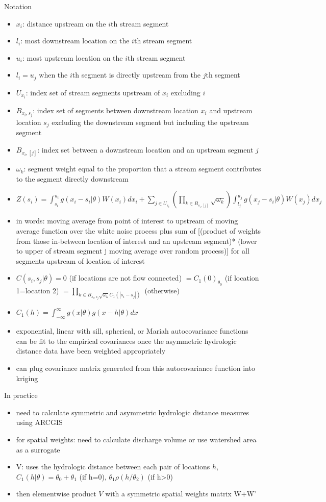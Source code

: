 \documentclass[12pt]{amsart}
\begin{document}
Notation
\begin{itemize}
\item $x_i$: distance upstream on the $i$th stream segment
\item $l_i$: most downstream location on the $i$th stream segment
\item $u_i$: most upstream location on the $i$th stream segment
\item $l_i=u_j$ when the $i$th segment is directly upstream from the $j$th segment
\item $U_{x_i}$: index set of stream segments upstream of $x_i$ excluding $i$
\item $B_{x_i, s_j}$: index set of segments between downstream location $x_i$ and upstream location $s_j$ excluding the downstream segment but including the upstream segment
\item $B_{x_i,[j]}$: index set between a downstream location and an upstream segment $j$
\item $\omega_k$: segment weight equal to the proportion that a stream segment contributes to the segment directly downstream
\item $Z(s_i)=\int_{s_i}^{u_i}g(x_i-s_i|\theta)W(x_i)dx_i + \sum_{j \in U_{s_i}} \left( \prod_{k \in B_{s_i,[j]}}\sqrt{\omega_k}\right) \int_{l_j}^{u_j} g(x_j-s_i|\theta)W(x_j)dx_j$
\item in words: moving average from point of interest to upstream of moving average function over the white noise process plus sum of [(product of weights from those in-between location of interest and an upstream segment)*  (lower to upper of stream segment j moving average over random process)] for all segments upstream of location of interest
\item $C(s_i,s_j|\theta) = 0$ (if locations are not flow connected) $= C_1(0)_\theta_0$ (if location 1=location 2) $= \prod_{k \in B_{s_i,s_j} \sqrt{\omega_k}C_1(|s_i-s_j|)}$ (otherwise)
\item $C_1(h)= \int_{-\infty}^\infty g(x|\theta) g(x-h|\theta)dx$
\item exponential, linear with sill, spherical, or Mariah autocovariance functions can be fit to the empirical covariances once the asymmetric hydrologic distance data have been weighted appropriately
\item can plug covariance matrix generated from this autocovariance function into kriging
\end{itemize}

In practice
\begin{itemize}
\item need to calculate symmetric and asymmetric hydrologic distance measures using ARCGIS
\item for spatial weights: need to calculate discharge volume or use watershed area as a surrogate
\item V: uses the hydrologic distance between each pair of locations $h$, $C_1(h|\theta)= \theta_0+\theta_1$ (if h=0), $\theta_1 \rho(h/\theta_2)$ (if h>0)
\item then elementwise product $V$ with a symmetric spatial weights matrix W+W'
\end{itemize}
\end{document}
